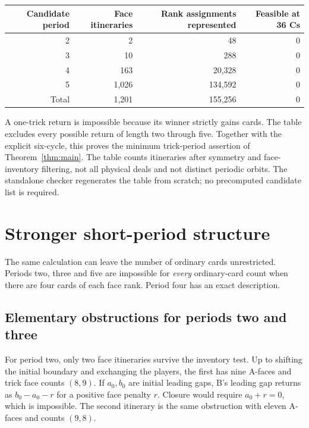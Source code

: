 \documentclass[11pt]{article}
\begin{document}
\begin{center}
\begin{tabular}{@{}rrrr@{}}
\toprule
Candidate period & Face itineraries & Rank assignments represented & Feasible at 36 Cs\\
\midrule
2 & 2 & 48 & 0\\
3 & 10 & 288 & 0\\
4 & 163 & 20,328 & 0\\
5 & 1,026 & 134,592 & 0\\
\midrule
Total & 1,201 & 155,256 & 0\\
\bottomrule
\end{tabular}
\end{center}

A one-trick return is impossible because its winner strictly gains cards.
The table excludes every possible return of length two through five. Together
with the explicit six-cycle, this proves the minimum trick-period assertion
of Theorem~\ref{thm:main}. The table counts
itineraries after symmetry and face-inventory filtering, not all physical
deals and not distinct periodic orbits. The standalone checker regenerates
the table from scratch; no precomputed candidate list is required.

\section{Stronger short-period structure}

The same calculation can leave the number of ordinary cards unrestricted.
Periods two, three and five are impossible for \emph{every} ordinary-card
count when there are four cards of each face rank. Period four has an exact
description.

\subsection{Elementary obstructions for periods two and three}

For period two, only two face itineraries survive the inventory test. Up to
shifting the initial boundary and exchanging the players, the first has
nine A-faces and trick face counts $(8,9)$. If $a_0,b_0$ are initial leading
gaps, B's leading gap returns as $b_0-a_0-r$ for a positive face penalty $r$.
Closure would require $a_0+r=0$, which is impossible. The second itinerary
is the same obstruction with eleven A-faces and counts $(9,8)$.
\end{document}
